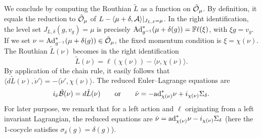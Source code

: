 \documentclass[pdftex]{sigma}
\newcommand{\A}{{\cal A}}
\newcommand{\B}{{\cal B}}
\newcommand{\Or}{{\cal O}}
\newcommand{\F}{\mathbb{F}}
\begin{document}
We conclude by computing the Routhian $\tilde L$ as a function on $\tilde \Or_\mu$. By def\/inition, it equals the reduction to $\tilde \Or_\mu$ of $L-\langle \mu+\delta,\A\rangle|_{J_{L,\delta} =\mu}$. In the right identif\/ication, the level set $J_{L,\delta}(g,v_g) =\mu$ is precisely ${\rm Ad}^*_{g^{-1}}(\mu +\delta(g)) = \F\ell(\xi)$, with $\xi g=v_g$. If we set $\nu = {\rm Ad}^*_{g^{-1}}(\mu +\delta(g)) \in \tilde\Or_\mu$, the f\/ixed momentum condition is $\xi = \chi(\nu)$. The Routhian  $\tilde L(\nu)$ becomes in the right identif\/ication \[\tilde L(\nu)=\ell(\chi(\nu)) - \langle \nu, \chi(\nu)\rangle.\] By application of the chain rule, it easily follows that $\langle d\tilde L (\nu), \dot \nu'\rangle  = -\langle \dot \nu',\chi(\nu)\rangle$.   The reduced Euler--Lagrange equations are
\begin{gather} \label{twiceredEL}
i_{\dot \nu} \tilde \B(\nu) = d \tilde L(\nu) \qquad \mbox{or} \qquad \dot \nu =- {\rm ad}^*_{\chi(\nu)}\nu + i_{\chi(\nu)} \Sigma_\delta.
\end{gather}
For later purpose, we remark that for a left action and $\ell$ originating from a left invariant Lagrangian, the reduced equations are $\dot \nu = {\rm ad}^*_{\chi(\nu)}\nu - i_{\chi(\nu)} \Sigma_\delta$ (here the 1-cocycle satisf\/ies $\sigma_\delta(g) = \delta(g)$).
\end{document}
